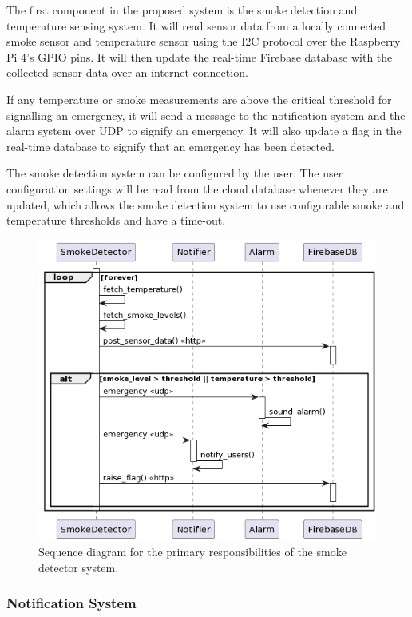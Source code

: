 The first component in the proposed system is the smoke detection and temperature sensing system. It will read sensor
data from a locally connected smoke sensor and temperature sensor using the I2C protocol over the Raspberry Pi 4's GPIO
pins. It will then update the real-time Firebase database with the collected sensor data over an internet connection.

If any temperature or smoke measurements are above the critical threshold for signalling an emergency, it will send a
message to the notification system and the alarm system over UDP to signify an emergency. It will also update a flag in
the real-time database to signify that an emergency has been detected.

The smoke detection system can be configured by the user. The user configuration settings will be read from the cloud
database whenever they are updated, which allows the smoke detection system to use configurable smoke and temperature
thresholds and have a time-out.

\begin{figure}[H]
    \centering
    \includegraphics[width=5in]{../assets/SmokeDetectorSequence.png}
    \caption{Sequence diagram for the primary responsibilities of the smoke detector system.}
    \label{fig:smoke-detector-sq}
\end{figure}

\subsubsection{Notification System}

